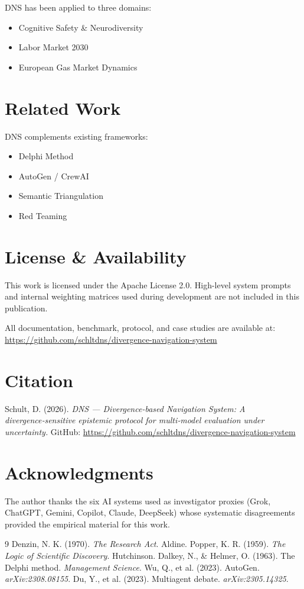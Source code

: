 \documentclass[12pt]{article}
\begin{document}
DNS has been applied to three domains:
\begin{itemize}
    \item Cognitive Safety \& Neurodiversity
    \item Labor Market 2030
    \item European Gas Market Dynamics
\end{itemize}

\section{Related Work}

DNS complements existing frameworks:
\begin{itemize}
    \item Delphi Method
    \item AutoGen / CrewAI
    \item Semantic Triangulation
    \item Red Teaming
\end{itemize}

\section{License \& Availability}

\noindent This work is licensed under the Apache License 2.0.  
High-level system prompts and internal weighting matrices used during development are not included in this publication.

\noindent All documentation, benchmark, protocol, and case studies are available at:\\
\url{https://github.com/schltdns/divergence-navigation-system}

\section{Citation}

Schult, D. (2026). \textit{DNS — Divergence-based Navigation System: A divergence‑sensitive epistemic protocol for multi‑model evaluation under uncertainty.} GitHub: \url{https://github.com/schltdns/divergence-navigation-system}

\section*{Acknowledgments}

The author thanks the six AI systems used as investigator proxies (Grok, ChatGPT, Gemini, Copilot, Claude, DeepSeek) whose systematic disagreements provided the empirical material for this work.

\begin{thebibliography}{9}
 Denzin, N. K. (1970). \textit{The Research Act}. Aldine.
 Popper, K. R. (1959). \textit{The Logic of Scientific Discovery}. Hutchinson.
 Dalkey, N., \& Helmer, O. (1963). The Delphi method. \textit{Management Science}.
 Wu, Q., et al. (2023). AutoGen. \textit{arXiv:2308.08155}.
 Du, Y., et al. (2023). Multiagent debate. \textit{arXiv:2305.14325}.
\end{thebibliography}
\end{document}
